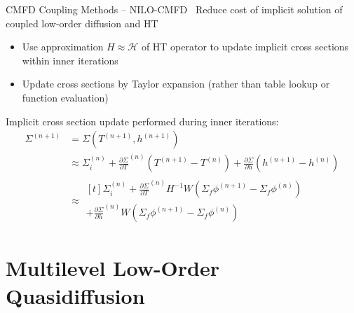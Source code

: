 \documentclass{beamer}
\begin{document}
\begin{frame}{CMFD Coupling Methods -- NILO-CMFD~\cite{adamowicz2023nilo}}
    Reduce cost of implicit solution of coupled low-order diffusion and HT
    \begin{itemize}
        \item Use approximation $H \approx \mathcal{H}$ of HT operator to update implicit cross sections within inner iterations
        \item Update cross sections by Taylor expansion (rather than table lookup or function evaluation)
    \end{itemize}

    Implicit cross section update performed during inner iterations:
    \begin{align}
        \Sigma^{(n+1)} &= \Sigma(T^{(n+1)}, h^{(n+1)})\\
                       &\approx \Sigma_i^{(n)} + \frac{\partial\Sigma}{\partial T}^{(n)}\left( T^{(n+1)} - T^{(n)} \right) + \frac{\partial \Sigma}{\partial h}\left(h^{(n+1)} - h^{(n)} \right)\\
                       &\approx \begin{multlined}[t]
                        \Sigma_i^{(n)} + \frac{\partial\Sigma}{\partial T}^{(n)}H^{-1}W\left( \Sigma_f\phi^{(n+1)} -\Sigma_f\phi^{(n)}\right)\\
                        + \frac{\partial \Sigma}{\partial h}^{(n)}W\left( \Sigma_f\phi^{(n+1)} -\Sigma_f\phi^{(n)}\right)
                       \end{multlined}
    \end{align}
\end{frame}

\section{Multilevel Low-Order Quasidiffusion}
\end{document}
